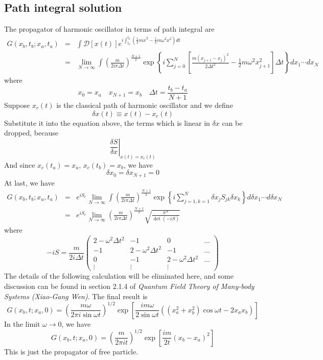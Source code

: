 \subsection{Path integral solution}
The propagator of harmonic oscillator in terms of path integral are
\begin{eqnarray}
G(x_b,t_b;x_a,t_a) &=& \int \mathcal{D}[x(t)] e^{i\int_{t_a}^{t_b} (\frac{1}{2}m\dot{x}^2 - \frac{1}{2}m\omega^2 x^2)dt} \nonumber \\
&=& \lim_{N \to \infty} \int \left(\frac{m}{2i\pi\Delta t}\right)^{\frac{N+1}{2}} \exp \left\{ i \sum_{j=0}^{N}\left[ \frac{m(x_{j+1}-x_{j})^2}{2\Delta t^2}   - \frac{1}{2}m\omega^2 x_{j+1}^2 \right] \Delta t \right\} dx_1 \cdots dx_N \nonumber
\end{eqnarray}
where
\[x_0 = x_a \quad x_{N+1} = x_b \quad \Delta t = \frac{t_b-t_a}{N+1}\]
Suppose $x_c(t)$ is the classical path of harmonic oscillator and we define
\[\delta x(t) \equiv x(t) - x_c(t)\]
Substitute it into the equation above, the terms which is linear in $\delta x$ can be dropped, because
\[\left. \frac{\delta S}{\delta x} \right|_{x(t) = x_c(t)}\]
And since $x_c(t_a) = x_a$, $x_c(t_b) = x_b$, we have
\[\delta x_{0} = \delta x_{N+1} = 0\]
At last, we have
\begin{eqnarray}
G(x_b,t_b;x_a,t_a) &=& e^{iS_c} \lim_{N \to \infty} \int \left(\frac{m}{2i\pi\Delta t}\right)^{\frac{N+1}{2}} \exp \left\{ i \sum_{j=1,k=1}^{N} \delta x_j S_{jk} \delta x_k\right\} d\delta x_1 \cdots d\delta x_N \nonumber \\
&=& e^{iS_c} \lim_{N \to \infty} \left(\frac{m}{2i\pi\Delta t}\right)^{\frac{N+1}{2}} \sqrt{\frac{\pi^N}{\det (-iS)}}
\end{eqnarray}
where
\[-iS = \frac{m}{2i\Delta t} \left( \begin{matrix} 2-\omega^2\Delta t^2 & -1& 0& \ldots \\ -1& 2-\omega^2\Delta t^2& -1& \ldots \\ 0& -1& 2-\omega^2\Delta t^2& \ldots \\ \vdots & \vdots & \vdots & \end{matrix} \right)\]
The details of the following calculation will be eliminated here, and some discussion can be found in section 2.1.4 of \emph{Quantum Field Theory of Many-body Systems (Xiao-Gang Wen)}. The final result is\\
\[G(x_b,t;x_a,0) = \left ( \frac{m\omega}{2\pi i \sin \omega t} \right )^{1/2}\exp \left [ \frac{im\omega}{2\sin\omega t} \left ((x_a^2 + x_b^2)\cos\omega t - 2x_a x_b  \right ) \right ]\]
In the limit $\omega \to 0$, we have
\[G(x_b,t;x_a,0) = \left ( \frac{m}{2\pi i t} \right )^{1/2}\exp \left [ \frac{im}{2t} \left ( x_b-x_a\right)^2 \right ]\]
This is just the propagator of free particle.

